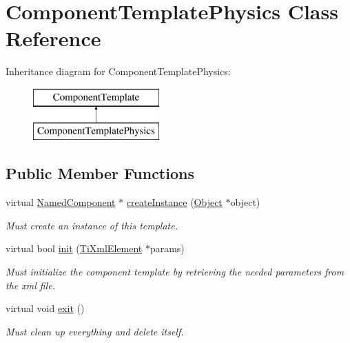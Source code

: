 \hypertarget{classComponentTemplatePhysics}{
\section{\-Component\-Template\-Physics \-Class \-Reference}
\label{d3/dcb/classComponentTemplatePhysics}
}
\-Inheritance diagram for \-Component\-Template\-Physics\-:\begin{figure}[H]
\begin{center}
\leavevmode
\includegraphics[height=2.000000cm]{d3/dcb/classComponentTemplatePhysics}
\end{center}
\end{figure}
\subsection*{\-Public \-Member \-Functions}
\begin{DoxyCompactItemize}
\item 
\hypertarget{classComponentTemplatePhysics_adbac8f8b10f133416db9bbf9e0c76da2}{
virtual \hyperlink{classNamedComponent}{\-Named\-Component} $\ast$ \hyperlink{classComponentTemplatePhysics_adbac8f8b10f133416db9bbf9e0c76da2}{create\-Instance} (\hyperlink{classObject}{\-Object} $\ast$object)}
\label{d3/dcb/classComponentTemplatePhysics_adbac8f8b10f133416db9bbf9e0c76da2}

\begin{DoxyCompactList}\small\item\em \-Must create an instance of this template. \end{DoxyCompactList}\item 
\hypertarget{classComponentTemplatePhysics_a6b5ecf21988ee49e791c1be509d0d90e}{
virtual bool \hyperlink{classComponentTemplatePhysics_a6b5ecf21988ee49e791c1be509d0d90e}{init} (\hyperlink{classTiXmlElement}{\-Ti\-Xml\-Element} $\ast$params)}
\label{d3/dcb/classComponentTemplatePhysics_a6b5ecf21988ee49e791c1be509d0d90e}

\begin{DoxyCompactList}\small\item\em \-Must initialize the component template by retrieving the needed parameters from the xml file. \end{DoxyCompactList}\item 
\hypertarget{classComponentTemplatePhysics_a9885a6ddb26e3b2333e58b3994d00ac0}{
virtual void \hyperlink{classComponentTemplatePhysics_a9885a6ddb26e3b2333e58b3994d00ac0}{exit} ()}
\label{d3/dcb/classComponentTemplatePhysics_a9885a6ddb26e3b2333e58b3994d00ac0}

\begin{DoxyCompactList}\small\item\em \-Must clean up everything and delete itself. \end{DoxyCompactList}\end{DoxyCompactItemize}
